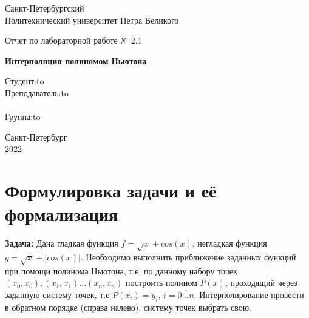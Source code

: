 \documentclass[12pt]{article}
\begin{document}
\begin{titlepage}
\Large

\begin{center}
Санкт-Петербургский \\ Политехнический университет Петра Великого

\vspace{10em}

Отчет по лабораторной работе № 2.1 \\

\vspace{2em}

\textbf{Интерполяция полиномом Ньютона}
\end{center}

\vspace{6em}

\newbox{\lbox}
\newlength{\maxl}
\setlength{\maxl}{\wd\lbox}
\hfill\parbox{14cm}{
\hspace*{5cm}\hspace*{-5cm}Студент:\hfill\hbox to\\
\hspace*{5cm}\hspace*{-5cm}Преподаватель:\hfill\hbox to\\
\\
\hspace*{5cm}\hspace*{-5cm}Группа:\hfill\hbox to\\}

\vspace{\fill}
\begin{center}
Санкт-Петербург \\2022
\end{center}
\end{titlepage}
\section{Формулировка задачи и её формализация}
\textbf{Задача:} Дана гладкая функция $f = \sqrt{x} + cos(x)$, негладкая функция $g = \sqrt{x} + |cos(x)|$. Необходимо выполнить приближение заданных функций при помощи полинома Ньютона, т.е. по данному набору точек $(x_0, x_0), (x_1, x_1) ... (x_n, x_n)$ построить полином $P(x)$, проходящий через заданную систему точек, т.е  $P(x_i) = y_i$, $i = \overline{0 ... n}$. Интерполирование провести в обратном порядке (справа налево), систему точек выбрать свою.
\end{document}
